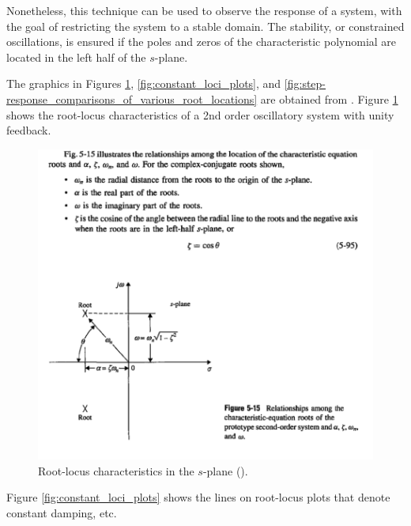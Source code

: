 \documentclass[10pt,letterpaper]{article}
\begin{document}
Nonetheless, this technique can be used to observe the response of a system, with the goal of restricting the system to a stable domain.
The stability, or constrained oscillations, is ensured if the poles and zeros of the characteristic polynomial are located in the left half of the $s$-plane.

The graphics in Figures \ref{fig:smd_rootlocus_characteristics_kuo}, \ref{fig:constant_loci_plots}, and \ref{fig:step-response_comparisons_of_various_root_locations} are obtained from \citet{kuo10.1}.
Figure \ref{fig:smd_rootlocus_characteristics_kuo} shows the root-locus characteristics of a 2nd order oscillatory system with unity feedback.

\begin{figure}
	\centering
	\includegraphics[width=\textwidth, height=\textheight, keepaspectratio]{smd_rootlocus_characteristics_kuo.png}
	\caption{Root-locus characteristics in the $s$-plane (\citet{kuo10.1}).}
	\label{fig:smd_rootlocus_characteristics_kuo}
\end{figure}

Figure \ref{fig:constant_loci_plots} shows the lines on root-locus plots that denote constant damping, etc.
\end{document}
